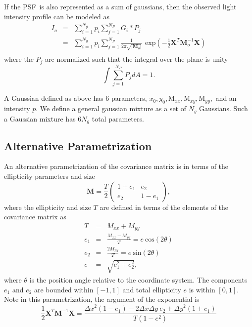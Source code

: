 \documentclass[10pt,preprint]{aastex}
\newcommand{\M}{\textbf{M}}
\newcommand{\X}{\textbf{X}}
\newcommand{\Dx}{\ensuremath{\Delta x}}
\newcommand{\Dy}{\ensuremath{\Delta y}}
\newcommand{\psf}{PSF}
\begin{document}
If the \psf\ is also represented as a sum of gaussians, then the observed
light intensity profile can be modeled as
\begin{eqnarray} \label{eq:postpsf}
I_o & = & \sum_{i=1}^{N_{g}} p_i \sum_{j=1}^{N_{P}} G_i * P_j \\
    & = & \sum_{i=1}^{N_{g}} p_i \sum_{j=1}^{N_{P}} \frac{1}{2 \pi \sqrt{|\M_o|} } ~~ \textrm{exp}\left( -\frac{1}{2} \X^T \M_o^{-1} \X \right) \\
\end{eqnarray}
where the $P_j$ are normalized such that the integral over
the plane is unity
\begin{equation}
\int \sum_{j=1}^{N_{P}} P_j dA = 1.
\end{equation}

A Gaussian defined as above has 6 parameters, $x_0, y_0, \textrm{M}_{xx},
\textrm{M}_{xy}, \textrm{M}_{yy},$ and an intensity $p$.  We define a general gaussian
mixture as a set of $N_g$ Gaussians.  Such a Gaussian 
mixture has $6 N_g$ total parameters.

\subsection{Alternative Parametrization}

An alternative parametrization of the covariance matrix is in
terms of the ellipticity parameters and size
\begin{equation}
\M = \frac{T}{2}\left( \begin{array}{cc}
1+e_1 & e_2 \\
e_2 & 1-e_1 \end{array} \right),
\end{equation}
where the ellipticity and size $T$ are defined in terms
of the elements of the covariance matrix as
\begin{eqnarray}
T & = & M_{xx} + M_{yy} \\
e_1 & = & \frac{M_{xx}-M_{yy}}{T}  = e ~ \textrm{cos} (2 \theta) \\
e_2 & = & \frac{2 M_{xy}}{T}  = e ~ \textrm{sin} (2 \theta) \\
e & = & \sqrt{e_1^2 + e_2^2},
\end{eqnarray}
where $\theta$ is the position angle relative to the coordinate system. 
The components 
$e_1$ and $e_2$ are bounded within
$[-1,1]$ and total ellipticity $e$ is within $[0,1]$.  Note in this
parametrization, the argument of the exponential is
\begin{equation}
\frac{1}{2} \X^T \M^{-1} \X = \frac{\Dx^2 (1-e_1) - 2 \Dx \Dy~e_2 + \Dy^2 (1+e_1)}{T (1-e^2)}
\end{equation}
\end{document}
